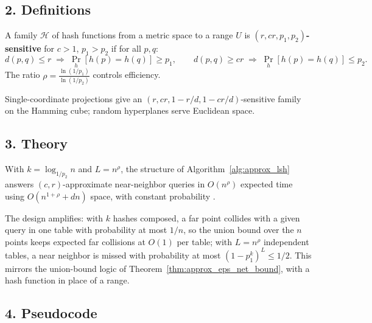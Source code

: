 \subsection{2. Definitions}

\begin{definition}\label{def:approx_lsh_sensitive}
  A family $\mathcal{H}$ of hash functions from a metric space to a range
  $U$ is \textbf{$(r, cr, p_1, p_2)$-sensitive} for $c > 1$, $p_1 > p_2$ if
  for all $p, q$:
  \[
    d(p,q) \leq r \;\Rightarrow\; \Pr_h[h(p) = h(q)] \geq p_1, \qquad
    d(p,q) \geq cr \;\Rightarrow\; \Pr_h[h(p) = h(q)] \leq p_2 .
  \]
  The ratio $\rho = \frac{\ln(1/p_1)}{\ln(1/p_2)}$ controls efficiency.
\end{definition}

Single-coordinate projections give an $(r, cr, 1 - r/d, 1 - cr/d)$-sensitive
family on the Hamming cube; random hyperplanes serve Euclidean space.

\subsection{3. Theory}

\begin{theorem}\label{thm:approx_lsh_quality}
  With $k = \log_{1/p_2} n$ and $L = n^{\rho}$, the structure of
  Algorithm~\ref{alg:approx_lsh} answers $(c, r)$-approximate near-neighbor
  queries in $O(n^{\rho})$ expected time using $O(n^{1+\rho} + dn)$ space,
  with constant probability \cite{indyk1998}.
\end{theorem}

The design amplifies: with $k$ hashes composed, a far point collides with a
given query in one table with probability at most $1/n$, so the union bound
over the $n$ points keeps expected far collisions at $O(1)$ per table; with
$L = n^{\rho}$ independent tables, a near neighbor is missed with
probability at most $(1 - p_1^k)^L \leq 1/2$. This mirrors the union-bound
logic of Theorem~\ref{thm:approx_eps_net_bound}, with a hash function in
place of a range.

\subsection{4. Pseudocode}

